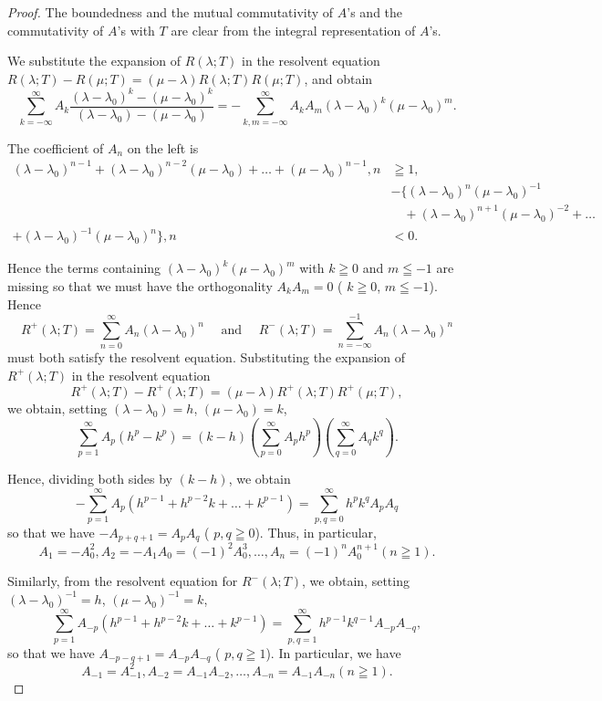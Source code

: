 \begin{proof}
 The boundedness and the mutual commutativity of $A$'s and the commutativity of $A$'s with $T$ are clear from the integral representation of $A$'s. 


We substitute the expansion of $R(\lambda; T)$ in the resolvent equation $R(\lambda; T) - R(\mu; T) = (\mu - \lambda) R(\lambda; T) R(\mu; T)$, and obtain 
\[
\sum\limits_{k = - \infty} ^{\infty} A _{k} \frac {(\lambda - \lambda_{0}) ^{k} - (\mu - \lambda_{0}) ^{k}}{(\lambda - \lambda_{0}) - (\mu - \lambda_{0})} = - \sum\limits_{k, m = - \infty} ^{\infty} A _{k} A _{m} (\lambda - \lambda_{0}) ^{k} (\mu - \lambda_{0}) ^{m}.
\]

The coefficient of $A_{n}$ on the left is 
\[
\begin{aligned}
(\lambda - \lambda_{0}) ^{n-1} + (\lambda - \lambda_{0}) ^{n-2} (\mu - \lambda_{0}) + \dots + (\mu - \lambda_{0}) ^{n-1}, n& \geqq 1,
\\
& - \{(\lambda - \lambda_{0}) ^{n} (\mu - \lambda_{0}) ^{-1}
\\
&\quad + (\lambda - \lambda_{0}) ^{n+1} (\mu - \lambda_{0}) ^{-2} + \dots
\\
+ (\lambda - \lambda_{0}) ^{-1} (\mu - \lambda_{0}) ^{n} \}, n& < 0.
\end{aligned}
\]

Hence the terms containing $(\lambda - \lambda_0)^k (\mu - \lambda_0)^m$ with $k \geqq 0$ and $m \leqq -1$ are missing so that we must have the orthogonality $A_k A_m = 0$ ( $k \geqq 0$, $m \leqq -1$). Hence 
\[
R ^{+} (\lambda ; T) = \sum\limits_{n=0} ^{\infty} A _{n} (\lambda - \lambda_{0}) ^{n} \quad \text{ and } \quad R ^{-} (\lambda ; T) = \sum\limits_{n = - \infty} ^{-1} A _{n} (\lambda - \lambda_{0}) ^{n}
\]
must both satisfy the resolvent equation. Substituting the expansion of $R^{+}(\lambda; T)$ in the resolvent equation 
\[
R ^{+} (\lambda ; T) - R ^{+} (\lambda ; T) = (\mu - \lambda) R ^{+} (\lambda ; T) R ^{+} (\mu ; T),
\]
we obtain, setting $(\lambda - \lambda_0) = h$, $(\mu - \lambda_0) = k$, 
\[
\sum\limits_{p=1} ^{\infty} A _{p} \left(h ^{p} - k ^{p}\right) = (k - h) \left(\sum\limits_{p=0} ^{\infty} A _{p} h ^{p}\right) \left(\sum\limits_{q=0} ^{\infty} A _{q} k ^{q}\right).
\]

Hence, dividing both sides by $(k - h)$, we obtain 
\[
- \sum\limits_{p=1} ^{\infty} A _{p} (h ^{p-1} + h ^{p-2} k + \dots + k ^{p-1}) = \sum\limits_{p,q=0} ^{\infty} h ^{p} k ^{q} A _{p} A _{q}
\]
so that we have $-A_{p+q+1} = A_pA_q$ ( $p, q \geqq 0$). Thus, in particular, 
\[
A _{1} = - A _{0} ^{2}, A _{2} = - A _{1} A _{0} = (- 1) ^{2} A _{0} ^{3}, \dots , A _{n} = (- 1) ^{n} A _{0} ^{n+1} (n \geqq 1).
\]

Similarly, from the resolvent equation for $R^{-}(\lambda; T)$, we obtain, setting $(\lambda - \lambda_{0})^{-1} = h$, $(\mu - \lambda_{0})^{-1} = k$, 
\[
\sum\limits_{p=1} ^{\infty} A _{-p} \left(h ^{p-1} + h ^{p-2} k + \dots + k ^{p-1}\right) = \sum\limits_{p,q=1} ^{\infty} h ^{p-1} k ^{q-1} A _{-p} A _{-q},
\]
so that we have $A_{-p-q+1} = A_{-p}A_{-q}$ ( $p, q \geqq 1$). In particular, we have 
\[
A _{-1} = A _{-1} ^{2}, A _{-2} = A _{-1} A _{-2}, \dots , A _{-n} = A _{-1} A _{-n} (n \geqq 1).
\]
\end{proof}

